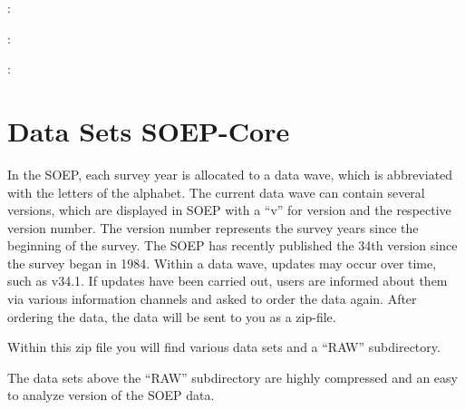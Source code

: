 \documentclass[letterpaper,10pt,openany,onesideH,english]{sphinxmanual}
\begin{document}

:

:


:


\section{Data Sets SOEP-Core}
\label{\detokenize{Principles of Data Structure/index:data-sets-soep-core}}\label{\detokenize{Principles of Data Structure/index:datasets}}
In the SOEP, each survey year is allocated to a data wave, which is abbreviated with the letters of the alphabet. The current data wave can contain several versions, which are displayed in SOEP with a “v” for version and the respective version number. The version number represents the survey years since the beginning of the survey. The SOEP has recently published the 34th version since the survey began in 1984. Within a data wave, updates may occur over time, such as v34.1. If updates have been carried out, users are informed about them via various information channels and asked to order the data again. After ordering the data, the data will be sent to you as a zip-file.

\begin{figure}[H]
\centering

\noindent{}
\end{figure}

Within this zip file you will find various data sets and a “RAW” subdirectory.

\begin{figure}[H]
\centering

\noindent{}
\end{figure}

The data sets above the “RAW” subdirectory are highly compressed and an easy to analyze version of the SOEP data.

\begin{figure}[H]
\centering

\noindent{}
\end{figure}
\end{document}
